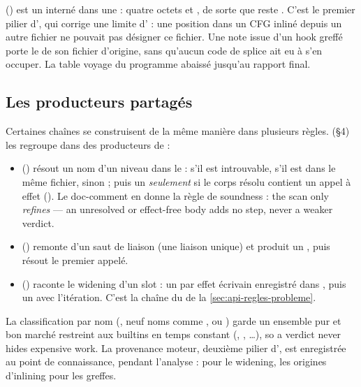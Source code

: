  () est un  interné dans une  : quatre octets et , de sorte que  reste . C'est le premier pilier d', qui corrige une limite d' : une position dans un CFG inliné depuis un autre fichier ne pouvait pas désigner ce fichier. Une note issue d'un hook greffé porte le  de son fichier d'origine, sans qu'aucun code de splice ait eu à s'en occuper. La table voyage du programme abaissé jusqu'au rapport final.

\subsection{Les producteurs partagés}

Certaines chaînes se construisent de la même manière dans plusieurs règles.  (§4) les regroupe dans des producteurs de  :
\begin{itemize}
  \item {} () résout un nom d'un niveau dans le  :  s'il est introuvable,  s'il est dans le même fichier,  sinon ; puis un  \emph{seulement} si le corps résolu contient un appel à effet (). Le doc-comment en donne la règle de soundness : \og the scan only \emph{refines} --- an unresolved or effect-free body adds no step, never a weaker verdict\fg.
  \item {} () remonte d'un saut de liaison (une liaison unique) et produit un , puis résout le premier appelé.
  \item {} () raconte le widening d'un slot : un  par effet écrivain enregistré dans , puis un  avec l'itération. C'est la chaîne du  de la \cref{sec:api-regles-probleme}.
\end{itemize}
La classification par nom (, neuf noms comme ,  ou ) garde un ensemble \og pur et bon marché\fg{} restreint aux builtins en temps constant (, , \ldots), \og so a  verdict never hides expensive work\fg. La provenance moteur, deuxième pilier d', est enregistrée au point de connaissance, pendant l'analyse :  pour le widening, les origines d'inlining pour les greffes.

